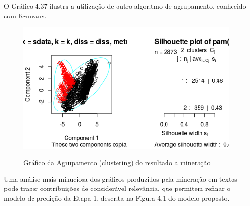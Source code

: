 O Gráfico 4.37 ilustra a utilização de outro algoritmo de agrupamento, conhecido com K-means. 

\begin{figure}
\centering
\caption{Gráfico da Agrupamento (clustering) do resultado a mineração}
\includegraphics[width=0.7\linewidth]{Figuras/Twitter/Cluster2}
\label{fig:Cluster2}
\end{figure}

Uma análise mais minuciosa dos gráficos produzidos pela mineração em textos pode trazer contribuições de considerável relevância, que permitem refinar o modelo de predição da Etapa 1, descrita na Figura 4.1 do modelo proposto.

